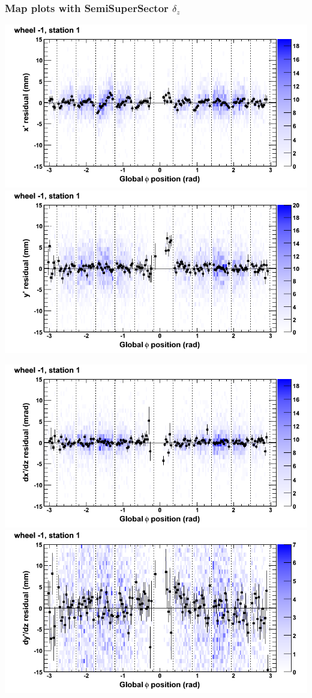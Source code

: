 \documentclass[compress]{beamer}
\begin{document}
\begin{frame}
\frametitle{Map plots with SemiSuperSector $\delta_z$}
\includegraphics[width=0.5\linewidth]{zfit_mapplots/DTvsphi_st1whB_x.png}
\includegraphics[width=0.5\linewidth]{zfit_mapplots/DTvsphi_st1whB_y.png}

\includegraphics[width=0.5\linewidth]{zfit_mapplots/DTvsphi_st1whB_dxdz.png}
\includegraphics[width=0.5\linewidth]{zfit_mapplots/DTvsphi_st1whB_dydz.png}
\end{frame}
\end{document}
